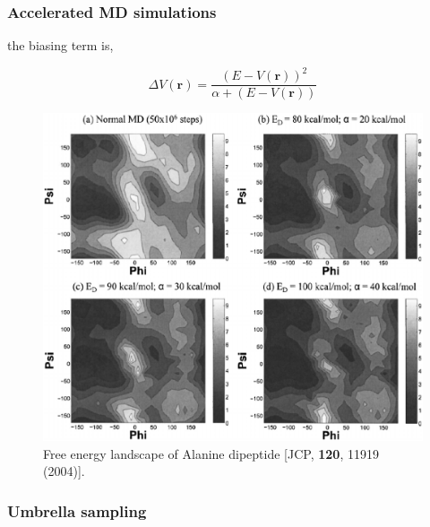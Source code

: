 \documentclass{beamer}
\begin{document}
\begin{frame}
\frametitle{Accelerated MD simulations}

the biasing term is,

\begin{equation}                                                                                                                                            
\Delta V(\mathbf{r}) = \frac{ ( E-V(\mathbf{r}) )^2 }{ \alpha + ( E-V(\mathbf{r}) )}
\end{equation}

\begin{figure}
\includegraphics[scale=0.18]{accmd_fe.eps}
\caption{{\scriptsize Free energy landscape of Alanine dipeptide [JCP, {\bf 120}, 11919 (2004)]. }}
\end{figure}

\end{frame}



\subsubsection{Umbrella sampling} 
\end{document}
